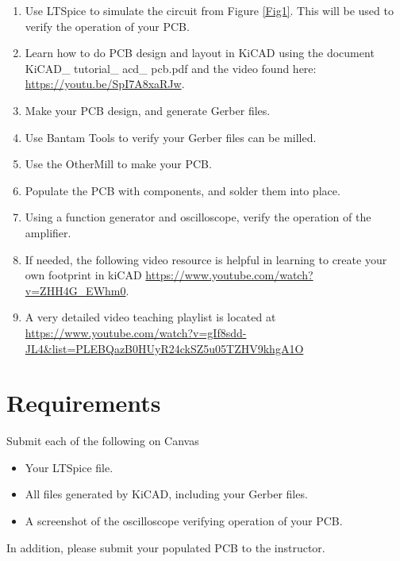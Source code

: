 \documentclass[12pt,letterpaper,onecolumn]{report}
\begin{document}
\begin{enumerate}
\item Use LTSpice to simulate the circuit from Figure \ref{Fig1}.  This will be used to verify the operation of your PCB.
\item Learn how to do PCB design and layout in KiCAD using the document KiCAD\_ tutorial\_ acd\_ pcb.pdf and the video found here: \url{https://youtu.be/SpI7A8xaRJw}.
\item Make your PCB design, and generate Gerber files.
\item Use Bantam Tools to verify your Gerber files can be milled.
\item Use the OtherMill to make your PCB.
\item Populate the PCB with components, and solder them into place.
\item Using a function generator and oscilloscope, verify the operation of the amplifier.
\item If needed, the following video resource is helpful in learning to create your own footprint in kiCAD \url{https://www.youtube.com/watch?v=ZHH4G_EWhm0}.
\item A very detailed video teaching playlist is located at \url{https://www.youtube.com/watch?v=gIf8sdd-JL4&list=PLEBQazB0HUyR24ckSZ5u05TZHV9khgA1O}
\end{enumerate}

\section*{Requirements}
\noindent Submit each of the following on Canvas
\begin{itemize}
\item Your LTSpice file.
\item All files generated by KiCAD, including your Gerber files.
\item A screenshot of the oscilloscope verifying operation of your PCB.
\end{itemize}
\noindent In addition, please submit your populated PCB to the instructor.
\end{document}
